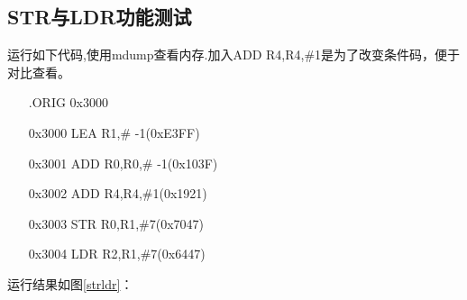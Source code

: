 \documentclass[UTF8]{ctexart}
\begin{document}
\subsection{STR与LDR功能测试}
运行如下代码,使用mdump查看内存.加入ADD R4,R4,\#1是为了改变条件码，便于对比查看。
\begin{enumerate}
  \item [ ] .ORIG 0x3000
  \item [0x3000] LEA R1,\# -1(0xE3FF)
  \item [0x3001] ADD R0,R0,\# -1(0x103F)
  \item [0x3002] ADD R4,R4,\#1(0x1921)
  \item [0x3003] STR R0,R1,\#7(0x7047)
  \item [0x3004] LDR R2,R1,\#7(0x6447)
\end{enumerate}
运行结果如图\ref{strldr}：
\end{document}
